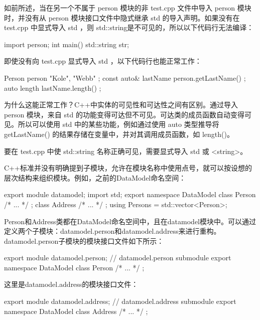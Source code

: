 
如前所述，当在另一个不属于 person 模块的非 test.cpp 文件中导入 person 模块时，并没有从 person 模块接口文件中隐式继承 std 的导入声明。如果没有在 test.cpp 中显式导入 std ，则 std::string是不可见的，所以以下代码行无法编译：

\begin{cpp}
import person;
int main()
{
    std::string str;
}
\end{cpp}

即使没有向 test.cpp 显式导入 std ，以下代码行也能正常工作：

\begin{cpp}
Person person { "Kole", "Webb" };
const auto& lastName { person.getLastName() };
auto length { lastName.length() };
\end{cpp}

为什么这能正常工作？C++中实体的可见性和可达性之间有区别。通过导入 person 模块，来自 std 的功能变得可达但不可见。可达类的成员函数自动变得可见。所以可以使用 std 中的某些功能，例如通过使用 auto 类型推导将 getLastName() 的结果存储在变量中，并对其调用成员函数，如 length()。

要在 test.cpp 中使 std::string 名称正确可见，需要显式导入 std 或 <string>。


C++标准并没有明确提到子模块，允许在模块名称中使用点号，就可以按设想的层次结构来组织模块。例如，之前的DataModel命名空间：

\begin{cpp}
export module datamodel;
import std;
export namespace DataModel
{
    class Person { /* ... */ };
    class Address { /* ... */ };
    using Persons = std::vector<Person>;
}
\end{cpp}

Person和Address类都在DataModel命名空间中，且在datamodel模块中。可以通过定义两个子模块：datamodel.person和datamodel.address来进行重构。datamodel.person子模块的模块接口文件如下所示：

\begin{cpp}
export module datamodel.person; // datamodel.person submodule
export namespace DataModel { class Person { /* ... */ }; }
\end{cpp}

这里是datamodel.address的模块接口文件：

\begin{cpp}
export module datamodel.address; // datamodel.address submodule
export namespace DataModel { class Address { /* ... */ }; }
\end{cpp}

